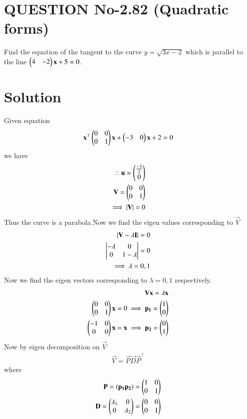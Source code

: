 \documentclass[journal,12pt,twocolumn]{IEEEtran}
\begin{document}
%
\section{QUESTION No-2.82 (Quadratic forms)}
\item Find the equation of the tangent to the curve $y=\sqrt{3x-2}$ which is parallel to the line $\begin{pmatrix}4&-2\end{pmatrix}\mathbf{x} + 5 = 0$.

%

\section{Solution}
Given equation
\begin{align}
    \mathbf{x}^{\top}\begin{pmatrix}0&0 \\ 0&1\end{pmatrix}\mathbf{x}+\begin{pmatrix}-3&0\end{pmatrix}\mathbf{x}+2=0
\end{align}
we have 
\begin{align}
\therefore \mathbf{u}=\begin{pmatrix}\frac{-3}{2} \\ 0\end{pmatrix}
\\
\mathbf{V} =\begin{pmatrix}0&0 \\ 0&1\end{pmatrix}
\\
\implies |\mathbf{V}|=0
\end{align}
Thus the curve is a parabola.Now we find the eigen values corresponding to $\vec{V}$
\begin{align}
    |\mathbf{V}-\lambda\mathbf{I}| = 0
    \\
    \begin{vmatrix}-\lambda&0 \\ 0&1-\lambda\end{vmatrix}=0
    \\
    \implies \lambda= 0,1
\end{align}
Now we find the eigen vectors corresponding to $\lambda= 0,1$ respectively.
\begin{align}
    \mathbf{V}\mathbf{x} = \lambda\mathbf{x}
    \\
    \begin{pmatrix}0&0 \\ 0&1\end{pmatrix}\mathbf{x} = 0\implies \mathbf{p_{1}}= \begin{pmatrix}1 \\ 0\end{pmatrix}
    \\
    \begin{pmatrix}-1&0 \\ 0&0\end{pmatrix}\mathbf{x} = \mathbf{x}\implies \mathbf{p_{2}}= \begin{pmatrix}0 \\ 1\end{pmatrix}
\end{align}
Now by eigen decomposition on $\vec{V}$
\begin{align}
    \vec{V} = \vec{P}\vec{D}\vec{P}^{\top}
\end{align}
where 
\begin{align}
 \mathbf{P} = \left(\mathbf{p_{1}}\mathbf{p_{2}}\right) = \begin{pmatrix}1&0 \\ 0&1\end{pmatrix}
 \\
 \mathbf{D}=\begin{pmatrix}\lambda_{1}&0 \\ 0&\lambda_{2}\end{pmatrix} = \begin{pmatrix}0&0 \\ 0&1\end{pmatrix}
\end{align}
\end{document}

